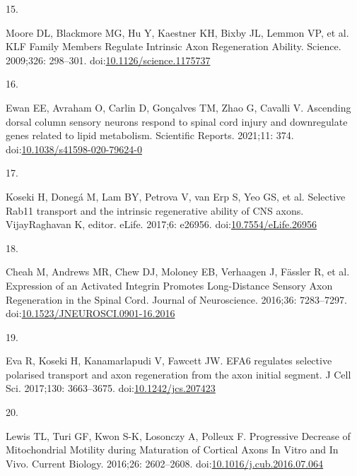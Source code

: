 \documentclass[
  12pt,
  a4paper,
]{book}
\newlength{\cslhangindent}
\newlength{\csllabelwidth}
\newlength{\cslentryspacingunit} %
\newenvironment{CSLReferences}[2] %
 {%
  \setlength{\parindent}{0pt}
  \ifodd #1
  \let\oldpar\par
  \def\par{\hangindent=\cslhangindent\oldpar}
  \fi
  \setlength{\parskip}{#2\cslentryspacingunit}
 }%
 {}
\newcommand{\CSLLeftMargin}[1]{\parbox[t]{\csllabelwidth}{#1}}
\newcommand{\CSLRightInline}[1]{\parbox[t]{\linewidth - \csllabelwidth}{#1}\break}
\begin{document}
\begin{CSLReferences}{0}{0}
\leavevmode{}%
\CSLLeftMargin{15. }%
\CSLRightInline{Moore DL, Blackmore MG, Hu Y, Kaestner KH, Bixby JL, Lemmon VP, et al. {KLF Family Members Regulate Intrinsic Axon Regeneration Ability}. Science. 2009;326: 298--301. doi:\href{https://doi.org/10.1126/science.1175737}{10.1126/science.1175737}}

\leavevmode{}%
\CSLLeftMargin{16. }%
\CSLRightInline{Ewan EE, Avraham O, Carlin D, Gonçalves TM, Zhao G, Cavalli V. Ascending dorsal column sensory neurons respond to spinal cord injury and downregulate genes related to lipid metabolism. Scientific Reports. 2021;11: 374. doi:\href{https://doi.org/10.1038/s41598-020-79624-0}{10.1038/s41598-020-79624-0}}

\leavevmode{}%
\CSLLeftMargin{17. }%
\CSLRightInline{Koseki H, Donegá M, Lam BY, Petrova V, van Erp S, Yeo GS, et al. Selective Rab11 transport and the intrinsic regenerative ability of {CNS} axons. VijayRaghavan K, editor. eLife. 2017;6: e26956. doi:\href{https://doi.org/10.7554/eLife.26956}{10.7554/eLife.26956}}

\leavevmode{}%
\CSLLeftMargin{18. }%
\CSLRightInline{Cheah M, Andrews MR, Chew DJ, Moloney EB, Verhaagen J, Fässler R, et al. Expression of an {Activated Integrin Promotes Long-Distance Sensory Axon Regeneration} in the {Spinal Cord}. Journal of Neuroscience. 2016;36: 7283--7297. doi:\href{https://doi.org/10.1523/JNEUROSCI.0901-16.2016}{10.1523/JNEUROSCI.0901-16.2016}}

\leavevmode{}%
\CSLLeftMargin{19. }%
\CSLRightInline{Eva R, Koseki H, Kanamarlapudi V, Fawcett JW. {EFA6} regulates selective polarised transport and axon regeneration from the axon initial segment. J Cell Sci. 2017;130: 3663--3675. doi:\href{https://doi.org/10.1242/jcs.207423}{10.1242/jcs.207423}}

\leavevmode{}%
\CSLLeftMargin{20. }%
\CSLRightInline{Lewis TL, Turi GF, Kwon S-K, Losonczy A, Polleux F. Progressive {Decrease} of {Mitochondrial Motility} during {Maturation} of {Cortical Axons In Vitro} and {In Vivo}. Current Biology. 2016;26: 2602--2608. doi:\href{https://doi.org/10.1016/j.cub.2016.07.064}{10.1016/j.cub.2016.07.064}}


\end{CSLReferences}
\end{document}
